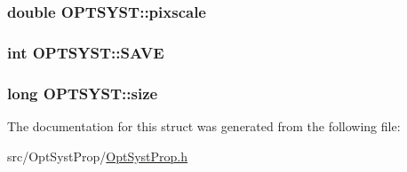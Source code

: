 \hypertarget{structOPTSYST_aa64373d953735e7fc898f664706ae434}{
\subsubsection[{pixscale}]{\setlength{\rightskip}{0pt plus 5cm}double O\+P\+T\+S\+Y\+S\+T\+::pixscale}}\label{structOPTSYST_aa64373d953735e7fc898f664706ae434}
\hypertarget{structOPTSYST_a1edeacc3267a9dae94f74a7ae2d5d668}{
\subsubsection[{S\+A\+V\+E}]{\setlength{\rightskip}{0pt plus 5cm}int O\+P\+T\+S\+Y\+S\+T\+::\+S\+A\+V\+E}}\label{structOPTSYST_a1edeacc3267a9dae94f74a7ae2d5d668}
\hypertarget{structOPTSYST_a1ca7a42369dc6bf1567dbeb3028c8a2a}{
\subsubsection[{size}]{\setlength{\rightskip}{0pt plus 5cm}long O\+P\+T\+S\+Y\+S\+T\+::size}}\label{structOPTSYST_a1ca7a42369dc6bf1567dbeb3028c8a2a}


The documentation for this struct was generated from the following file\+:\begin{DoxyCompactItemize}
\item 
src/\+Opt\+Syst\+Prop/\hyperlink{OptSystProp_8h}{Opt\+Syst\+Prop.\+h}\end{DoxyCompactItemize}
